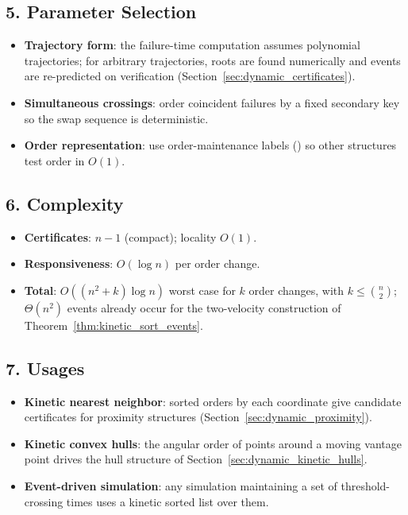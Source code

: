 \subsection{5. Parameter Selection}

\begin{itemize}
  \item \textbf{Trajectory form}: the failure-time computation assumes
    polynomial trajectories; for arbitrary trajectories, roots are found
    numerically and events are re-predicted on verification
    (Section~\ref{sec:dynamic_certificates}).
  \item \textbf{Simultaneous crossings}: order coincident failures by a fixed
    secondary key so the swap sequence is deterministic.
  \item \textbf{Order representation}: use order-maintenance labels
    (\cite{dietzsleator1987}) so other structures test order in $O(1)$.
\end{itemize}

\subsection{6. Complexity}

\begin{itemize}
  \item \textbf{Certificates}: $n-1$ (compact); locality $O(1)$.
  \item \textbf{Responsiveness}: $O(\log n)$ per order change.
  \item \textbf{Total}: $O((n^2 + k)\log n)$ worst case for $k$ order
    changes, with $k \le \binom{n}{2}$; $\Theta(n^2)$ events already occur
    for the two-velocity construction of Theorem~\ref{thm:kinetic_sort_events}.
\end{itemize}

\subsection{7. Usages}

\begin{itemize}
  \item \textbf{Kinetic nearest neighbor}: sorted orders by each coordinate
    give candidate certificates for proximity structures
    (Section~\ref{sec:dynamic_proximity}).
  \item \textbf{Kinetic convex hulls}: the angular order of points around a
    moving vantage point drives the hull structure of
    Section~\ref{sec:dynamic_kinetic_hulls}.
  \item \textbf{Event-driven simulation}: any simulation maintaining a set
    of threshold-crossing times uses a kinetic sorted list over them.
\end{itemize}

